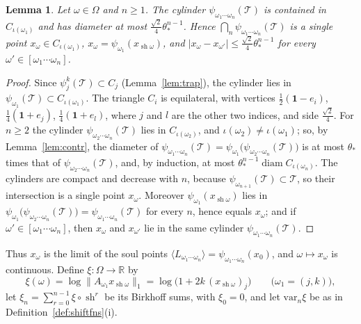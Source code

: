\documentclass[11pt]{amsart}
\newtheorem{lemma}[proposition]{Lemma}
\theoremstyle{definition}
\theoremstyle{remark}
\newcommand{\one}{\mathbf 1}
\newcommand{\R}{\mathbb R}
\newcommand{\cT}{\mathcal T}
\newcommand{\abs}[1]{\lvert #1\rvert}
\newcommand{\norm}[1]{\lVert #1\rVert}
\newcommand{\pr}[1]{\langle #1\rangle}
\DeclareMathOperator{\diam}{diam}
\begin{document}
\begin{lemma}\label{lem:coding}
Let $\omega\in\Omega$ and $n\ge1$. The cylinder $\psi_{\omega_1\cdots\omega_n}(\cT)$ is contained in $C_{\iota(\omega_1)}$ and has diameter at most $\frac{\sqrt2}4\theta_*^{n-1}$. Hence $\bigcap_n\psi_{\omega_1\cdots\omega_n}(\cT)$ is a single point $x_\omega\in C_{\iota(\omega_1)}$, $x_\omega=\psi_{\omega_1}(x_{\operatorname{sh}\omega})$, and $\abs{x_\omega-x_{\omega'}}\le\frac{\sqrt2}4\theta_*^{n-1}$ for every $\omega'\in[\omega_1\cdots\omega_n]$.
\end{lemma}

\begin{proof}
Since $\psi_j^k(\cT)\subset C_j$ (Lemma~\ref{lem:trap}), the cylinder lies in $\psi_{\omega_1}(\cT)\subset C_{\iota(\omega_1)}$. The triangle $C_i$ is equilateral, with vertices $\frac12(\one-e_i)$, $\frac14(\one+e_j)$, $\frac14(\one+e_l)$, where $j$ and $l$ are the other two indices, and side $\frac{\sqrt2}4$. For $n\ge2$ the cylinder $\psi_{\omega_2\cdots\omega_n}(\cT)$ lies in $C_{\iota(\omega_2)}$, and $\iota(\omega_2)\ne\iota(\omega_1)$; so, by Lemma~\ref{lem:contr}, the diameter of $\psi_{\omega_1\cdots\omega_n}(\cT)=\psi_{\omega_1}\bigl(\psi_{\omega_2\cdots\omega_n}(\cT)\bigr)$ is at most $\theta_*$ times that of $\psi_{\omega_2\cdots\omega_n}(\cT)$, and, by induction, at most $\theta_*^{n-1}\diam C_{\iota(\omega_n)}$. The cylinders are compact and decrease with $n$, because $\psi_{\omega_{n+1}}(\cT)\subset\cT$, so their intersection is a single point $x_\omega$. Moreover $\psi_{\omega_1}(x_{\operatorname{sh}\omega})$ lies in $\psi_{\omega_1}\bigl(\psi_{\omega_2\cdots\omega_n}(\cT)\bigr)=\psi_{\omega_1\cdots\omega_n}(\cT)$ for every $n$, hence equals $x_\omega$; and if $\omega'\in[\omega_1\cdots\omega_n]$, then $x_\omega$ and $x_{\omega'}$ lie in the same cylinder $\psi_{\omega_1\cdots\omega_n}(\cT)$.
\end{proof}

Thus $x_\omega$ is the limit of the soul points $\pr{L_{\omega_1\cdots\omega_n}}=\psi_{\omega_1\cdots\omega_n}(x_0)$, and $\omega\mapsto x_\omega$ is continuous. Define $\xi:\Omega\to\R$ by
\[
  \xi(\omega)=\log\norm{A_{\omega_1}x_{\operatorname{sh}\omega}}_1=\log\bigl(1+2k\,(x_{\operatorname{sh}\omega})_j\bigr)\qquad\bigl(\omega_1=(j,k)\bigr),
\]
let $\xi_n=\sum_{r=0}^{n-1}\xi\circ\operatorname{sh}^r$ be its Birkhoff sums, with $\xi_0=0$, and let $\mathrm{var}_n\xi$ be as in Definition~\ref{def:shiftfns}(i).
\end{document}
